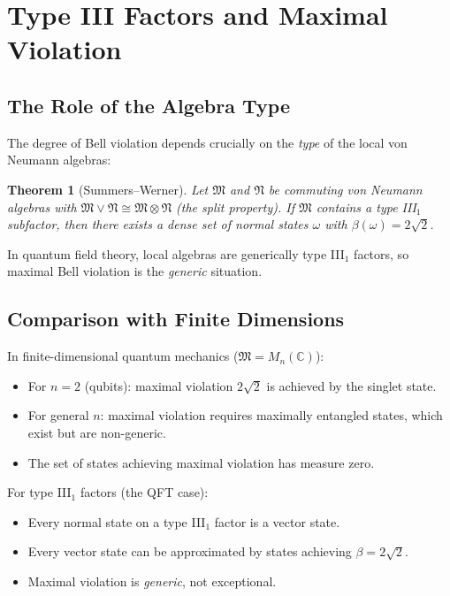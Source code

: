\documentclass[11pt,a4paper]{article}
\newtheorem{theorem}{Theorem}[section]
\begin{document}
\section{Type III Factors and Maximal Violation}

\subsection{The Role of the Algebra Type}

The degree of Bell violation depends crucially on the \emph{type} of the
local von Neumann algebras:

\begin{theorem}[Summers--Werner]
Let $\mathfrak{M}$ and $\mathfrak{N}$ be commuting von Neumann algebras
with $\mathfrak{M} \vee \mathfrak{N} \cong \mathfrak{M} \otimes \mathfrak{N}$
(the split property). If $\mathfrak{M}$ contains a type III$_1$ subfactor,
then there exists a dense set of normal states $\omega$ with
$\beta(\omega) = 2\sqrt{2}$.
\end{theorem}

In quantum field theory, local algebras are generically type III$_1$ factors,
so maximal Bell violation is the \emph{generic} situation.

\subsection{Comparison with Finite Dimensions}

In finite-dimensional quantum mechanics ($\mathfrak{M} = M_n(\mathbb{C})$):
\begin{itemize}[nosep]
  \item For $n=2$ (qubits): maximal violation $2\sqrt{2}$ is achieved by
        the singlet state.
  \item For general $n$: maximal violation requires maximally entangled states,
        which exist but are non-generic.
  \item The set of states achieving maximal violation has measure zero.
\end{itemize}

For type III$_1$ factors (the QFT case):
\begin{itemize}[nosep]
  \item Every normal state on a type III$_1$ factor is a vector state.
  \item Every vector state can be approximated by states achieving
        $\beta = 2\sqrt{2}$.
  \item Maximal violation is \emph{generic}, not exceptional.
\end{itemize}
\end{document}
